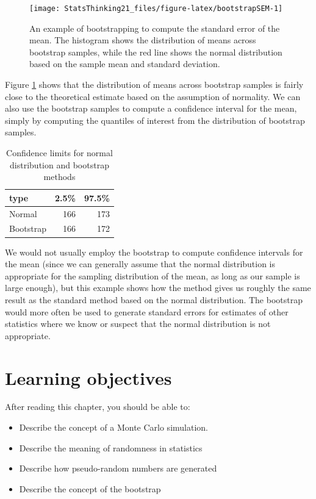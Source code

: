 \documentclass[12pt,]{book}
\providecommand{\tightlist}{%
  \setlength{\itemsep}{0pt}\setlength{\parskip}{0pt}}
\theoremstyle{definition}
\theoremstyle{definition}
\theoremstyle{definition}
\theoremstyle{remark}
\begin{document}
\begin{figure}
\texttt{[image: StatsThinking21\_files/figure-latex/bootstrapSEM-1]} \caption{An example of bootstrapping to compute the standard error of the mean. The histogram shows the distribution of means across bootstrap samples, while the red line shows the normal distribution based on the sample mean and standard deviation.}\label{fig:bootstrapSEM}
\end{figure}

Figure \ref{fig:bootstrapSEM} shows that the distribution of means across bootstrap samples is fairly close to the theoretical estimate based on the assumption of normality. We can also use the bootstrap samples to compute a confidence interval for the mean, simply by computing the quantiles of interest from the distribution of bootstrap samples.

\begin{table}

\caption{\label{tab:unnamed-chunk-40}Confidence limits for normal distribution and bootstrap methods}
\centering
\begin{tabular}[t]{l|r|r}
\hline
type & 2.5\% & 97.5\%\\
\hline
Normal & 166 & 173\\
\hline
Bootstrap & 166 & 172\\
\hline
\end{tabular}
\end{table}

We would not usually employ the bootstrap to compute confidence intervals for the mean (since we can generally assume that the normal distribution is appropriate for the sampling distribution of the mean, as long as our sample is large enough), but this example shows how the method gives us roughly the same result as the standard method based on the normal distribution. The bootstrap would more often be used to generate standard errors for estimates of other statistics where we know or suspect that the normal distribution is not appropriate.

\hypertarget{learning-objectives-7}{%
\section{Learning objectives}\label{learning-objectives-7}}

After reading this chapter, you should be able to:

\begin{itemize}
\tightlist
\item
  Describe the concept of a Monte Carlo simulation.
\item
  Describe the meaning of randomness in statistics
\item
  Describe how pseudo-random numbers are generated
\item
  Describe the concept of the bootstrap
\end{itemize}
\end{document}
